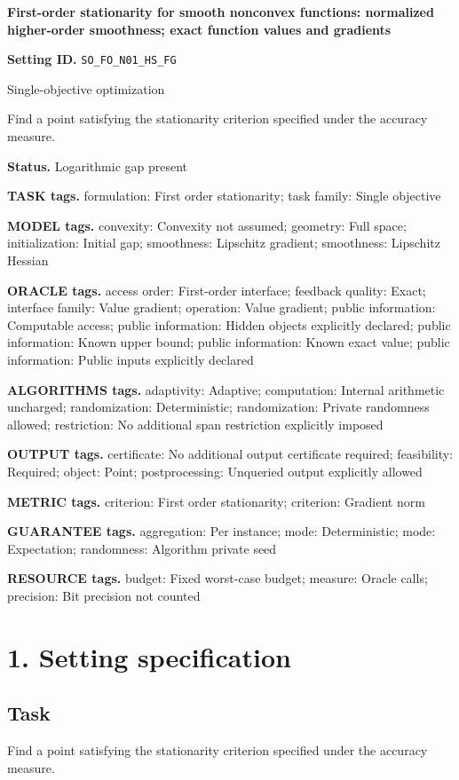\documentclass[10pt,a4paper]{article}
\begin{document}
\raggedright

{\LARGE\bfseries\sffamily\color{AtlasNavy} First-order stationarity for smooth nonconvex functions: normalized higher-order smoothness; exact function values and gradients\par}\vspace{5pt}
\textbf{Setting ID.} \texttt{SO\_\allowbreak{}FO\_\allowbreak{}N01\_\allowbreak{}HS\_\allowbreak{}FG}

Single-objective optimization

Find a point satisfying the stationarity criterion specified under the accuracy measure.

\textbf{Status.} Logarithmic gap present

\textbf{TASK tags.} formulation: First order stationarity; task family: Single objective

\textbf{MODEL tags.} convexity: Convexity not assumed; geometry: Full space; initialization: Initial gap; smoothness: Lipschitz gradient; smoothness: Lipschitz Hessian

\textbf{ORACLE tags.} access order: First-order interface; feedback quality: Exact; interface family: Value gradient; operation: Value gradient; public information: Computable access; public information: Hidden objects explicitly declared; public information: Known upper bound; public information: Known exact value; public information: Public inputs explicitly declared

\textbf{ALGORITHMS tags.} adaptivity: Adaptive; computation: Internal arithmetic uncharged; randomization: Deterministic; randomization: Private randomness allowed; restriction: No additional span restriction explicitly imposed

\textbf{OUTPUT tags.} certificate: No additional output certificate required; feasibility: Required; object: Point; postprocessing: Unqueried output explicitly allowed

\textbf{METRIC tags.} criterion: First order stationarity; criterion: Gradient norm

\textbf{GUARANTEE tags.} aggregation: Per instance; mode: Deterministic; mode: Expectation; randomness: Algorithm private seed

\textbf{RESOURCE tags.} budget: Fixed worst-case budget; measure: Oracle calls; precision: Bit precision not counted

\section{1. Setting specification}
\subsection{Task}
Find a point satisfying the stationarity criterion specified under the accuracy measure.
\end{document}
